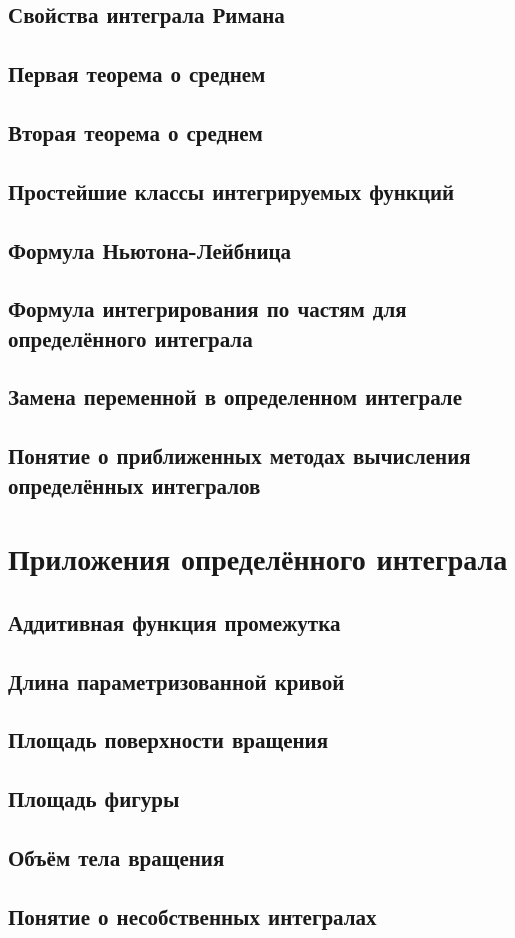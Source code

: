 \subsection{Свойства интеграла Римана}

\subsection{Первая теорема о среднем}

\subsection{Вторая теорема о среднем}

\subsection{Простейшие классы интегрируемых функций}

\subsection{Формула Ньютона-Лейбница}

\subsection{Формула интегрирования по частям для определённого интеграла}

\subsection{Замена переменной в определенном интеграле}
\subsection{Понятие о приближенных методах вычисления определённых интегралов}


\section{Приложения определённого интеграла}
\subsection{Аддитивная функция промежутка}

\subsection{Длина параметризованной кривой} 

\subsection{Площадь поверхности вращения}

\subsection{Площадь фигуры}

\subsection{Объём тела вращения}

\subsection{Понятие о несобственных интегралах}


